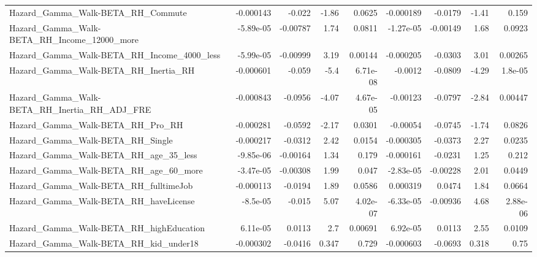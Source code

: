 \begin{tabular}{lrrrrrrrr}
Hazard\_Gamma\_Walk-BETA\_RH\_Commute                  &   -0.000143 &       -0.022 &    -1.86 &   0.0625 &  -0.000189 &     -0.0179 &        -1.41 &         0.159 \\
Hazard\_Gamma\_Walk-BETA\_RH\_Income\_12000\_more        &   -5.89e-05 &     -0.00787 &     1.74 &   0.0811 &  -1.27e-05 &    -0.00149 &         1.68 &        0.0923 \\
Hazard\_Gamma\_Walk-BETA\_RH\_Income\_4000\_less         &   -5.99e-05 &     -0.00999 &     3.19 &  0.00144 &  -0.000205 &     -0.0303 &         3.01 &       0.00265 \\
Hazard\_Gamma\_Walk-BETA\_RH\_Inertia\_RH               &   -0.000601 &       -0.059 &     -5.4 & 6.71e-08 &    -0.0012 &     -0.0809 &        -4.29 &       1.8e-05 \\
Hazard\_Gamma\_Walk-BETA\_RH\_Inertia\_RH\_ADJ\_FRE       &   -0.000843 &      -0.0956 &    -4.07 & 4.67e-05 &   -0.00123 &     -0.0797 &        -2.84 &       0.00447 \\
Hazard\_Gamma\_Walk-BETA\_RH\_Pro\_RH                   &   -0.000281 &      -0.0592 &    -2.17 &   0.0301 &   -0.00054 &     -0.0745 &        -1.74 &        0.0826 \\
Hazard\_Gamma\_Walk-BETA\_RH\_Single                   &   -0.000217 &      -0.0312 &     2.42 &   0.0154 &  -0.000305 &     -0.0373 &         2.27 &        0.0235 \\
Hazard\_Gamma\_Walk-BETA\_RH\_age\_35\_less              &   -9.85e-06 &     -0.00164 &     1.34 &    0.179 &  -0.000161 &     -0.0231 &         1.25 &         0.212 \\
Hazard\_Gamma\_Walk-BETA\_RH\_age\_60\_more              &   -3.47e-05 &     -0.00308 &     1.99 &    0.047 &  -2.83e-05 &    -0.00228 &         2.01 &        0.0449 \\
Hazard\_Gamma\_Walk-BETA\_RH\_fulltimeJob              &   -0.000113 &      -0.0194 &     1.89 &   0.0586 &   0.000319 &      0.0474 &         1.84 &        0.0664 \\
Hazard\_Gamma\_Walk-BETA\_RH\_haveLicense              &    -8.5e-05 &       -0.015 &     5.07 & 4.02e-07 &  -6.33e-05 &    -0.00936 &         4.68 &      2.88e-06 \\
Hazard\_Gamma\_Walk-BETA\_RH\_highEducation            &    6.11e-05 &       0.0113 &      2.7 &  0.00691 &   6.92e-05 &      0.0113 &         2.55 &        0.0109 \\
Hazard\_Gamma\_Walk-BETA\_RH\_kid\_under18              &   -0.000302 &      -0.0416 &    0.347 &    0.729 &  -0.000603 &     -0.0693 &        0.318 &          0.75 \\

\end{tabular}

